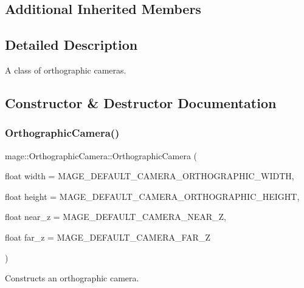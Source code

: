 \subsection*{Additional Inherited Members}


\subsection{Detailed Description}
A class of orthographic cameras. 

\subsection{Constructor \& Destructor Documentation}
\hypertarget{classmage_1_1_orthographic_camera_a4a9c362b0c1cb90608b699deb3ae8b23}{}\label{classmage_1_1_orthographic_camera_a4a9c362b0c1cb90608b699deb3ae8b23} 
\subsubsection{\texorpdfstring{Orthographic\+Camera()}{OrthographicCamera()}\hspace{0.1cm}{\footnotesize\ttfamily [1/3]}}
{\footnotesize\ttfamily mage\+::\+Orthographic\+Camera\+::\+Orthographic\+Camera (\begin{DoxyParamCaption}\item[{float}]{width = {\ttfamily MAGE\+\_\+DEFAULT\+\_\+CAMERA\+\_\+ORTHOGRAPHIC\+\_\+WIDTH},  }\item[{float}]{height = {\ttfamily MAGE\+\_\+DEFAULT\+\_\+CAMERA\+\_\+ORTHOGRAPHIC\+\_\+HEIGHT},  }\item[{float}]{near\+\_\+z = {\ttfamily MAGE\+\_\+DEFAULT\+\_\+CAMERA\+\_\+NEAR\+\_\+Z},  }\item[{float}]{far\+\_\+z = {\ttfamily MAGE\+\_\+DEFAULT\+\_\+CAMERA\+\_\+FAR\+\_\+Z} }\end{DoxyParamCaption})\hspace{0.3cm}{\ttfamily [explicit]}}

Constructs an orthographic camera.


